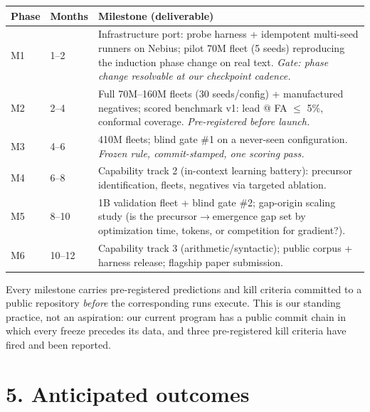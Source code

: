 \documentclass[11pt]{article}
\begin{document}
\begin{center}\small
\begin{tabular}{@{}llp{9.2cm}@{}}
\toprule
Phase & Months & Milestone (deliverable) \\
\midrule
M1 & 1--2 & Infrastructure port: probe harness + idempotent multi-seed runners on Nebius;
  pilot 70M fleet (5 seeds) reproducing the induction phase change on real text.
  \emph{Gate: phase change resolvable at our checkpoint cadence.} \\
M2 & 2--4 & Full 70M--160M fleets (30 seeds/config) + manufactured negatives; scored
  benchmark v1: lead @ FA $\leq$ 5\%, conformal coverage. \emph{Pre-registered before
  launch.} \\
M3 & 4--6 & 410M fleets; blind gate \#1 on a never-seen configuration.
  \emph{Frozen rule, commit-stamped, one scoring pass.} \\
M4 & 6--8 & Capability track 2 (in-context learning battery): precursor identification,
  fleets, negatives via targeted ablation. \\
M5 & 8--10 & 1B validation fleet + blind gate \#2; gap-origin scaling study
  (is the precursor$\to$emergence gap set by optimization time, tokens, or
  competition for gradient?). \\
M6 & 10--12 & Capability track 3 (arithmetic/syntactic); public corpus + harness release;
  flagship paper submission. \\
\bottomrule
\end{tabular}
\end{center}

Every milestone carries pre-registered predictions and kill criteria committed to a public
repository \emph{before} the corresponding runs execute. This is our standing practice, not
an aspiration: our current program has a public commit chain in which every freeze precedes
its data, and three pre-registered kill criteria have fired and been reported.

\section*{5. Anticipated outcomes}
\end{document}
